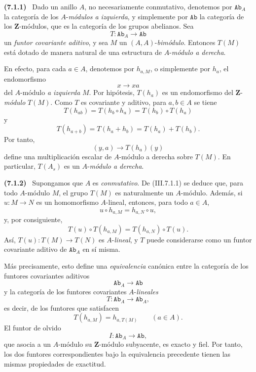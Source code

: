 \documentclass[10pt,oneside]{book}
\newcommand{\bb}[1]{\mathbf{#1}}
\newcommand{\cat}[1]{\mathtt{#1}}
\newcommand{\sref}[2][]{\textup{(#2)}}
\newenvironment{env}[1][]{\par\medskip\noindent\textbf{(#1)}\ }{\par}
\begin{document}
\begin{env}[7.1.1]
\label{III.7.1.1}
Dado un anillo $A$, no necesariamente conmutativo, denotemos por
$\cat{Ab}_A$ la categoría de los $A$-\emph{módulos a izquierda}, y
simplemente por $\cat{Ab}$ la categoría de los $\bb Z$-módulos,
que es la categoría de los grupos abelianos. Sea
\[
  T:\cat{Ab}_A\longrightarrow\cat{Ab}
\]
un \emph{funtor covariante aditivo}, y sea $M$ un $(A,A)$-\emph{bimódulo}.
Entonces $T(M)$ está dotado de manera natural de una estructura de
$A$-\emph{módulo a derecha}.

En efecto, para cada $a\in A$, denotemos por $h_{a,M}$, o
simplemente por $h_a$, el endomorfismo
\[
  x\to xa
\]
del $A$-módulo \emph{a izquierda} $M$. Por hipótesis, $T(h_a)$ es un
endomorfismo del $\bb Z$-\emph{módulo} $T(M)$. Como $T$ es covariante y
aditivo, para $a,b\in A$ se tiene
\[
  T(h_{ab})
  =
  T(h_b\circ h_a)
  =
  T(h_b)\circ T(h_a)
\]
y
\[
  T(h_{a+b})
  =
  T(h_a+h_b)
  =
  T(h_a)+T(h_b).
\]
Por tanto,
\[
  (y,a)\to T(h_a)(y)
\]
define una multiplicación escalar de $A$-módulo a derecha sobre
$T(M)$. En particular, $T(A_s)$ es un $A$-\emph{módulo a derecha}.
\end{env}

\begin{env}[7.1.2]
\label{III.7.1.2}
Supongamos que $A$ es \emph{conmutativo}. De \sref{III.7.1.1} se deduce
que, para todo $A$-módulo $M$, el grupo $T(M)$ es naturalmente un
$A$-módulo. Además, si $u:M\to N$ es un homomorfismo
$A$-lineal, entonces, para todo $a\in A$,
\[
  u\circ h_{a,M}=h_{a,N}\circ u,
\]
y, por consiguiente,
\[
  T(u)\circ T(h_{a,M})
  =
  T(h_{a,N})\circ T(u).
\]
Así, $T(u):T(M)\to T(N)$ es $A$-\emph{lineal}, y $T$ puede considerarse
como un funtor covariante aditivo de $\cat{Ab}_A$ en sí misma.

Más precisamente, esto define una \emph{equivalencia} canónica entre la
categoría de los funtores covariantes aditivos
\[
  \cat{Ab}_A\longrightarrow\cat{Ab}
\]
y la categoría de los funtores covariantes $A$-\emph{lineales}
\[
  T:\cat{Ab}_A\longrightarrow\cat{Ab}_A,
\]
es decir, de los funtores que satisfacen
\[
  T(h_{a,M})=h_{a,T(M)}
  \qquad(a\in A).
\]
El funtor de olvido
\[
  I:\cat{Ab}_A\longrightarrow\cat{Ab},
\]
que asocia a un $A$-módulo su $\bb Z$-módulo subyacente, es exacto
y fiel. Por tanto, los dos funtores correspondientes bajo la
equivalencia precedente tienen las mismas propiedades de exactitud.
\end{env}
\end{document}

